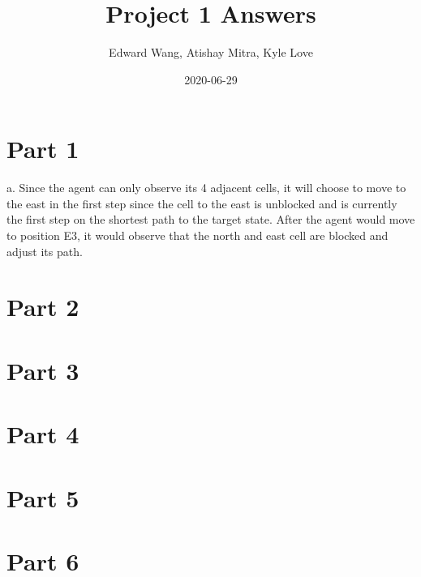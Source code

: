 \documentclass{article}
\title{Project 1 Answers}
\date{2020-06-29}
\author{Edward Wang, Atishay Mitra, Kyle Love}
\begin{document}
\maketitle

\section{Part 1}
a. Since the agent can only observe its 4 adjacent cells, it will choose to move to the east in the first step since the cell to the east is unblocked and is currently the first step on the shortest path to the target state. After the agent would move to position E3, it would observe that the north and east cell are blocked and adjust its path. 

\section{Part 2}

\section{Part 3}

\section{Part 4}

\section{Part 5}

\section{Part 6}
\end{document}

